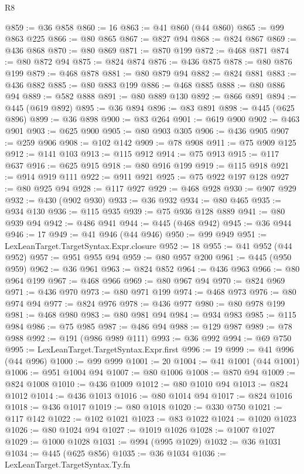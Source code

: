 \begin{lexlean}{R8}
\begin{coremodule}
@859 := @36 @858
@860 := 16
@863 := @41 @860 (@44 @860)
@865 := @99 @863 @225
@866 := @80 @865
@867 := @827 @94
@868 := @824 @867
@869 := @436 @868
@870 := @80 @869
@871 := @870 @199
@872 := @468 @871
@874 := @80 @872 @94
@875 := @824 @874
@876 := @436 @875
@878 := @80 @876 @199
@879 := @468 @878
@881 := @80 @879 @94
@882 := @824 @881
@883 := @436 @882
@885 := @80 @883 @199
@886 := @468 @885
@888 := @80 @886 @94
@889 := @582 @888
@891 := @80 @889 @130
@892 := @866 @891
@894 := @445 (@619 @892)
@895 := @36 @894
@896 := @83 @891
@898 := @445 (@625 @896)
@899 := @36 @898
@900 := @83 @264
@901 := @619 @900
@902 := @463 @901
@903 := @625 @900
@905 := @80 @903 @305
@906 := @436 @905
@907 := @259 @906
@908 := @102 @142
@909 := @78 @908
@911 := @75 @909 @125
@912 := @141 @103
@913 := @115 @912
@914 := @75 @913
@915 := @117 @637
@916 := @625 @915
@918 := @80 @916 @199
@919 := @115 @918
@921 := @914 @919 @111
@922 := @911 @921
@925 := @75 @922 @197 @128
@927 := @80 @925 @94
@928 := @117 @927
@929 := @468 @928
@930 := @907 @929
@932 := @430 (@902 @930)
@933 := @36 @932
@934 := @80 @465
@935 := @934 @130
@936 := @115 @935
@939 := @75 @936 @128 @889
@941 := @80 @939 @94
@942 := @486 @941
@944 := @445 (@468 @942)
@945 := @36 @944
@946 := 17
@949 := @41 @946 (@44 @946)
@950 := @99 @949
@951 := LexLeanTarget.TargetSyntax.Expr.closure
@952 := 18
@955 := @41 @952 (@44 @952)
@957 := @951 @955 @94
@959 := @80 @957 @200
@961 := @445 (@950 @959)
@962 := @36 @961
@963 := @824 @852
@964 := @436 @963
@966 := @80 @964 @199
@967 := @468 @966
@969 := @80 @967 @94
@970 := @824 @969
@971 := @436 @970
@973 := @80 @971 @199
@974 := @468 @973
@976 := @80 @974 @94
@977 := @824 @976
@978 := @436 @977
@980 := @80 @978 @199
@981 := @468 @980
@983 := @80 @981 @94
@984 := @934 @983
@985 := @115 @984
@986 := @75 @985
@987 := @486 @94
@988 := @129 @987
@989 := @78 @988
@992 := @191 (@986 @989 @111)
@993 := @36 @992
@994 := @69 @750
@995 := LexLeanTarget.TargetSyntax.Expr.first
@996 := 19
@999 := @41 @996 (@44 @996)
@1000 := @99 @999
@1001 := 20
@1004 := @41 @1001 (@44 @1001)
@1006 := @951 @1004 @94
@1007 := @80 @1006
@1008 := @870 @94
@1009 := @824 @1008
@1010 := @436 @1009
@1012 := @80 @1010 @94
@1013 := @824 @1012
@1014 := @436 @1013
@1016 := @80 @1014 @94
@1017 := @824 @1016
@1018 := @436 @1017
@1019 := @80 @1018
@1020 := @330 @750
@1021 := @117 @142
@1022 := @102 @1021
@1023 := @83 @1022
@1024 := @1020 @1023
@1026 := @80 @1024 @94
@1027 := @1019 @1026
@1028 := @1007 @1027
@1029 := @1000 @1028
@1031 := @994 (@995 @1029)
@1032 := @36 @1031
@1034 := @445 (@625 @856)
@1035 := @36 @1034
@1036 := LexLeanTarget.TargetSyntax.Ty.fn

\end{coremodule}
\end{lexlean}
